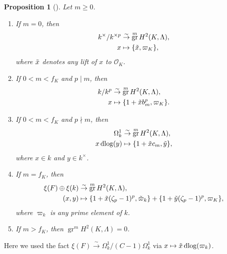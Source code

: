 \documentclass{amsart}
\newtheorem{Prop}[Thm]{Proposition}
\theoremstyle{remark}
\numberwithin{equation}{subsection}
\newcommand{\Order}{\mathcal{O}}
\newcommand{\isomto}{\overset{\sim}{\to}}
\DeclareMathOperator{\gr}{gr}
\DeclareMathOperator{\dlog}{dlog}
\begin{document}
\begin{Prop}[{\cite[\S 2, Proposition 1]{Kat79}}] \label{0043}
	Let $m \ge 0$.
	\begin{enumerate}
		\item \label{0175}
			If $m = 0$, then
				\begin{align*}
							k^{\times} / k^{\times p}
					&	\isomto
							\gr^{m} H^{2}(K, \Lambda),
					\\
							x
					&	\mapsto
							\{\Tilde{x}, \varpi_{K}\},
				\end{align*}
			where $\Tilde{x}$ denotes any lift of $x$ to $\Order_{K}$.
		\item \label{0176}
			If $0 < m < f_{K}$ and $p \mid m$, then
				\begin{align*}
							k / k^{p}
					&	\isomto
							\gr^{m} H^{2}(K, \Lambda),
					\\
							x
					&	\mapsto
							\{1 + \Tilde{x} b_{m}^{p}, \varpi_{K}\}.
				\end{align*}
		\item \label{0177}
			If $0 < m < f_{K}$ and $p \nmid m$, then
				\begin{align*}
							\Omega_{k}^{1}
					&	\isomto
							\gr^{m} H^{2}(K, \Lambda),
					\\
							x \dlog(y)
					&	\mapsto
							\{1 + \Tilde{x} c_{m}, \Tilde{y}\},
				\end{align*}
			where $x \in k$ and $y \in k^{\times}$.
		\item \label{0178}
			If $m = f_{K}$, then
				\begin{align*}
								\xi(F)
							\oplus
								\xi(k)
					&	\isomto
							\gr^{m} H^{2}(K, \Lambda),
					\\
							(x, y)
					&	\mapsto
								\{1 + \Tilde{x} (\zeta_{p} - 1)^{p}, \Tilde{\varpi}_{k}\}
							+
								\{1 + \Tilde{y} (\zeta_{p} - 1)^{p}, \varpi_{K}\},
				\end{align*}
			where $\varpi_{k}$ is any prime element of $k$.
		\item \label{0179}
			If $m > f_{K}$, then $\gr^{m} H^{2}(K, \Lambda) = 0$.
	\end{enumerate}
\end{Prop}

Here we used the fact $\xi(F) \isomto \Omega_{k}^{1} / (C - 1) \Omega_{k}^{1}$
via $x \mapsto \Tilde{x} \dlog(\varpi_{k})$.
\end{document}
